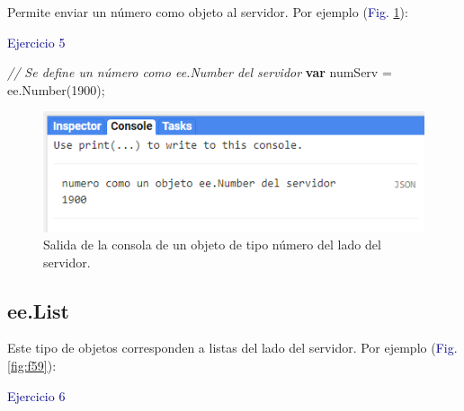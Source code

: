 \documentclass[
  12pt,
  letterpaper,
  twoside]{book}
\newenvironment{Shaded}{\begin{snugshade}}{\end{snugshade}}
\newcommand{\CommentTok}[1]{\textcolor[rgb]{0.24,0.58,0.00}{\textit{#1}}}
\newcommand{\ControlFlowTok}[1]{\textcolor[rgb]{0.00,0.00,0.00}{\textbf{#1}}}
\newcommand{\DecValTok}[1]{\textcolor[rgb]{0.28,0.53,0.93}{#1}}
\newcommand{\FunctionTok}[1]{\textcolor[rgb]{0.48,0.12,0.64}{#1}}
\newcommand{\KeywordTok}[1]{\textcolor[rgb]{0.48,0.12,0.64}{#1}}
\newcommand{\NormalTok}[1]{#1}
\newcommand{\OperatorTok}[1]{\textcolor[rgb]{0.00,0.00,0.00}{#1}}
\begin{document}
Permite enviar un número como objeto al servidor. Por ejemplo (\textcolor{darkblue}{Fig.} \ref{fig:f58}):

\textcolor{darkblue}{Ejercicio 5}

\begin{Shaded}
\begin{Highlighting}[]
\CommentTok{// Se define un número como ee.Number del servidor}
\ControlFlowTok{var}\NormalTok{ numServ }\OperatorTok{=} \KeywordTok{ee}\OperatorTok{.}\FunctionTok{Number}\NormalTok{(}\DecValTok{1900}\NormalTok{)}\OperatorTok{;}                              
\end{Highlighting}
\end{Shaded}

\begin{figure}[H]

{\centering \includegraphics[width=0.95\linewidth]{Img/ej5} 

}

\caption{Salida de la consola de un objeto de tipo número del lado del servidor.}\label{fig:f58}
\end{figure}

\hypertarget{ee.list}{%
\subsection*{ee.List}\label{ee.list}}

Este tipo de objetos corresponden a listas del lado del servidor. Por ejemplo (\textcolor{darkblue}{Fig.} \ref{fig:f59}):

\textcolor{darkblue}{Ejercicio 6}
\end{document}
